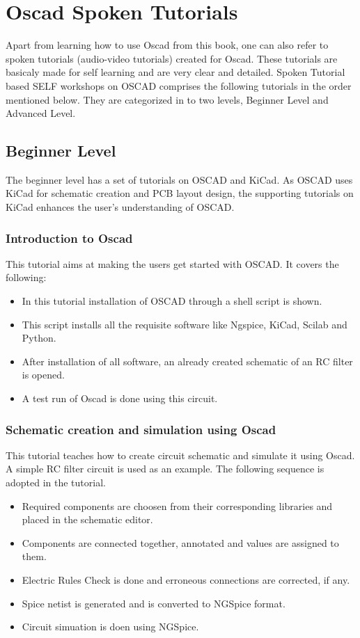 \chapter {Oscad Spoken Tutorials}

Apart from learning how to use Oscad from this book, one can also refer to spoken tutorials (audio-video tutorials) created for Oscad. These tutorials are basicaly made for self learning and are very clear and detailed. Spoken Tutorial based SELF workshops on OSCAD comprises the following tutorials in the order mentioned below. They are categorized in to two levels, Beginner Level and Advanced Level.


\section{Beginner Level}
The beginner level has a set of tutorials on OSCAD and KiCad. As OSCAD uses KiCad for schematic creation and PCB layout design, the supporting tutorials on KiCad enhances the user's understanding of OSCAD.


\subsection {Introduction to Oscad}
 This tutorial aims at making the users get started with OSCAD. It covers the following:

\begin{itemize}
\item In this tutorial installation of OSCAD through a shell script is shown. 
\item This script installs all the requisite software like Ngspice, KiCad, Scilab and Python.
\item After installation of all software, an already created schematic of an RC filter is opened.
\item A test run of Oscad is done using this circuit.
\end{itemize}

\subsection {Schematic creation and simulation using Oscad}
This tutorial teaches how to create circuit schematic and simulate it using Oscad. A simple RC filter circuit is used as an example. The following sequence is adopted in the tutorial.
\begin{itemize}
\item Required components are choosen from their corresponding libraries and placed in the schematic editor.
\item Components are connected together, annotated and values are assigned to them.
\item Electric Rules Check is done and erroneous connections are corrected, if any.
\item Spice netist is generated and is converted to NGSpice format.
\item Circuit simuation is doen using NGSpice. 
\end{itemize}

